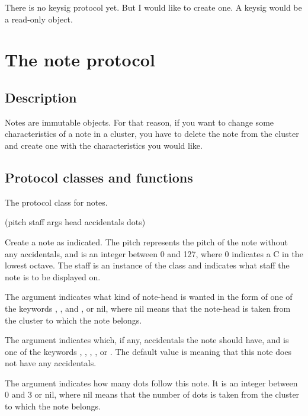 There is no keysig protocol yet.  But I would like to create one.  A
keysig would be a read-only object.  

\section{The note protocol}

\subsection{Description}

Notes are immutable objects.  For that reason, if you want to change
some characteristics of a note in a cluster, you have to delete the
note from the cluster and create one with the characteristics you
would like. 

\subsection{Protocol classes and functions}


The protocol class for notes. 

 (pitch staff \rest args \key head accidentals dots)

Create a note as indicated.  The pitch represents the pitch of the
note without any accidentals, and is an integer between 0 and 127,
where 0 indicates a C in the lowest octave.  The staff is an instance
of the class  and indicates what staff the note is to
be displayed on.  

The  argument indicates what kind of note-head is wanted
in the form of one of the keywords , ,
and , or nil, where nil means that the note-head is
taken from the cluster to which the note belongs.

The  argument indicates which, if any,
accidentals the note should have, and is one of the keywords 
, , ,
, or .  The default value is
 meaning that this note does not have any
accidentals. 

The  argument indicates how many dots follow this note.
It is an integer between 0 and 3 or nil, where nil means that the
number of dots is taken  from the cluster to which the note belongs.

